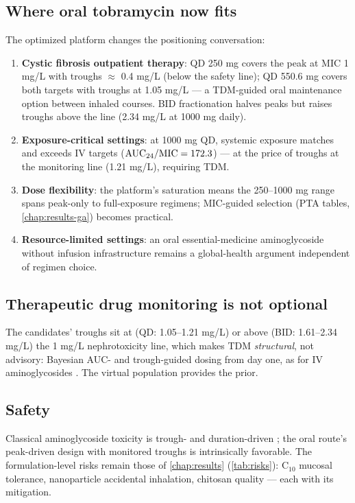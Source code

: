 \subsection{Where oral tobramycin now fits}
The optimized platform changes the positioning conversation:
\begin{enumerate}
\item \textbf{Cystic fibrosis outpatient therapy}: QD 250 mg covers the peak at MIC 1 mg/L with troughs $\approx$ 0.4 mg/L (below the safety line); QD 550.6 mg covers both targets with troughs at 1.05 mg/L --- a TDM-guided oral maintenance option between inhaled courses. BID fractionation halves peaks but raises troughs above the line (2.34 mg/L at 1000 mg daily).
\item \textbf{Exposure-critical settings}: at 1000 mg QD, systemic exposure matches and exceeds IV targets ($\mathrm{AUC}_{24}/\mathrm{MIC} = 172.3$) --- at the price of troughs at the monitoring line (1.21 mg/L), requiring TDM.
\item \textbf{Dose flexibility}: the platform's saturation means the 250--1000 mg range spans peak-only to full-exposure regimens; MIC-guided selection (PTA tables, \cref{chap:results-ga}) becomes practical.
\item \textbf{Resource-limited settings}: an oral essential-medicine aminoglycoside without infusion infrastructure remains a global-health argument independent of regimen choice.
\end{enumerate}

\subsection{Therapeutic drug monitoring is not optional}
The candidates' troughs sit at (QD: 1.05--1.21 mg/L) or above (BID: 1.61--2.34 mg/L) the 1 mg/L nephrotoxicity line, which makes TDM \emph{structural}, not advisory: Bayesian AUC- and trough-guided dosing from day one, as for IV aminoglycosides \citep{Bauer2008, Li2021}. The virtual population provides the prior.

\subsection{Safety}
Classical aminoglycoside toxicity is trough- and duration-driven \citep{Craig1998}; the oral route's peak-driven design with monitored troughs is intrinsically favorable. The formulation-level risks remain those of \cref{chap:results} (\cref{tab:risks}): C$_{10}$ mucosal tolerance, nanoparticle accidental inhalation, chitosan quality --- each with its mitigation.

